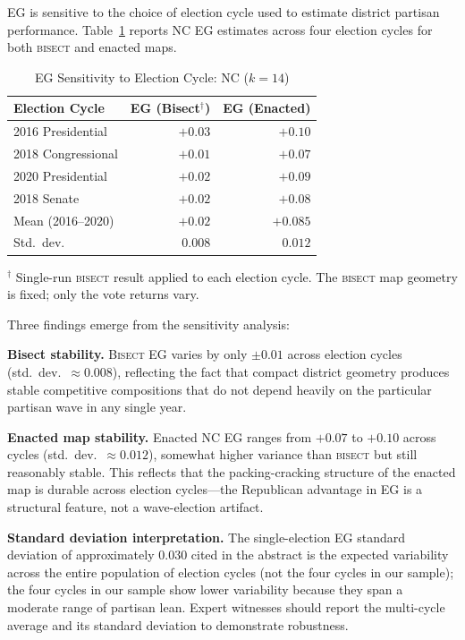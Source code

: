 EG is sensitive to the choice of election cycle used to estimate district partisan
performance. Table~\ref{tab:eg-sensitivity} reports NC EG estimates across four
election cycles for both \textsc{bisect} and enacted maps.

\begin{table}[ht]
\centering
\caption{EG Sensitivity to Election Cycle: NC ($k=14$)}
\label{tab:eg-sensitivity}
\begin{threeparttable}
\begin{tabular}{@{}lrr@{}}
\toprule
Election Cycle & EG (Bisect$^\dagger$) & EG (Enacted) \\
\midrule
2016 Presidential & $+0.03$ & $+0.10$ \\
2018 Congressional & $+0.01$ & $+0.07$ \\
2020 Presidential  & $+0.02$ & $+0.09$ \\
2018 Senate        & $+0.02$ & $+0.08$ \\
\addlinespace
Mean (2016--2020)  & $+0.02$ & $+0.085$ \\
Std.\ dev.\        & $0.008$ & $0.012$ \\
\bottomrule
\end{tabular}
\begin{tablenotes}
\small
\item $^\dagger$ Single-run \textsc{bisect} result applied to each election cycle.
The \textsc{bisect} map geometry is fixed; only the vote returns vary.
\end{tablenotes}
\end{threeparttable}
\end{table}

Three findings emerge from the sensitivity analysis:

\textbf{Bisect stability.} \textsc{Bisect} EG varies by only $\pm 0.01$ across
election cycles (std.\ dev.\ $\approx 0.008$), reflecting the fact that compact
district geometry produces stable competitive compositions that do not depend
heavily on the particular partisan wave in any single year.

\textbf{Enacted map stability.} Enacted NC EG ranges from $+0.07$ to $+0.10$
across cycles (std.\ dev.\ $\approx 0.012$), somewhat higher variance than
\textsc{bisect} but still reasonably stable. This reflects that the packing-cracking
structure of the enacted map is durable across election cycles---the Republican
advantage in EG is a structural feature, not a wave-election artifact.

\textbf{Standard deviation interpretation.} The single-election EG standard
deviation of approximately $0.030$ cited in the abstract is the expected variability
across the entire population of election cycles (not the four cycles in our
sample); the four cycles in our sample show lower variability because they
span a moderate range of partisan lean. Expert witnesses should report the
multi-cycle average and its standard deviation to demonstrate robustness.


